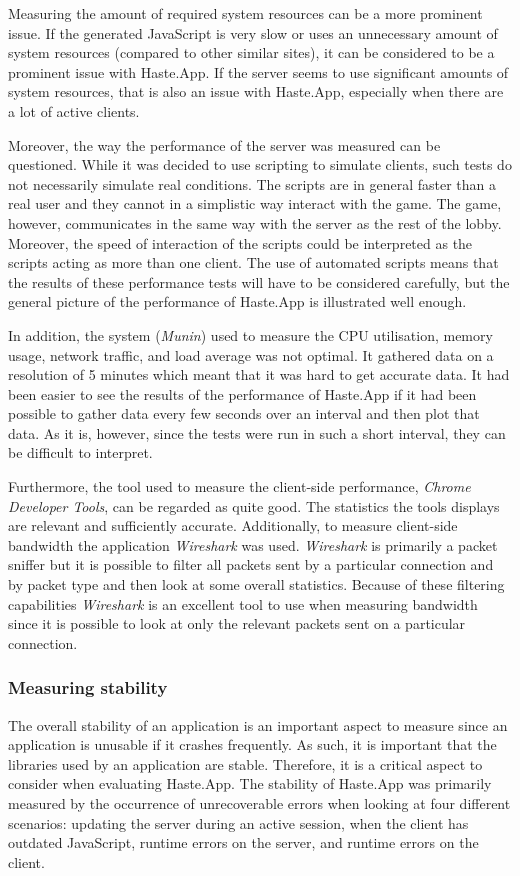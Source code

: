 \documentclass[a4paper]{article}
\begin{document}
Measuring the amount of required system resources can be a more prominent issue. If the generated JavaScript is very slow or uses an unnecessary amount of system resources (compared to other similar sites), it can be considered to be a prominent issue with Haste.App. If the server seems to use significant amounts of system resources, that is also an issue with Haste.App, especially when there are a lot of active clients.

Moreover, the way the performance of the server was measured can be questioned. While it was decided to use scripting to simulate clients, such tests do not necessarily simulate real conditions. The scripts are in general faster than a real user and they cannot in a simplistic way interact with the game. The game, however, communicates in the same way with the server as the rest of the lobby. Moreover, the speed of interaction of the scripts could be interpreted as the scripts acting as more than one client. The use of automated scripts means that the results of these performance tests will have to be considered carefully, but the general picture of the performance of Haste.App is illustrated well enough.

In addition, the system (\textit{Munin}) used to measure the CPU utilisation, memory usage, network traffic, and load average was not optimal. It gathered data on a resolution of 5 minutes which meant that it was hard to get accurate data. It had been easier to see the results of the performance of Haste.App if it had been possible to gather data every few seconds over an interval and then plot that data. As it is, however, since the tests were run in such a short interval, they can be difficult to interpret.

Furthermore, the tool used to measure the client-side performance, \textit{Chrome Developer Tools}, can be regarded as quite good. The statistics the tools displays are relevant and sufficiently accurate.  Additionally, to measure client-side bandwidth the application \textit{Wireshark} was used. \textit{Wireshark} is primarily a packet sniffer but it is possible to filter all packets sent by a particular connection and by packet type and then look at some overall statistics. Because of these filtering capabilities \textit{Wireshark} is an excellent tool to use when measuring bandwidth since it is possible to look at only the relevant packets sent on a particular connection.




\subsubsection{Measuring stability}
The overall stability of an application is an important aspect to measure since an application is unusable if it crashes frequently. As such, it is important that the libraries used by an application are stable. Therefore, it is a critical aspect to consider when evaluating Haste.App. The stability of Haste.App was primarily measured by the occurrence of unrecoverable errors when looking at four different scenarios: updating the server during an active session, when the client has outdated JavaScript, runtime errors on the server, and runtime errors on the client.
\end{document}
